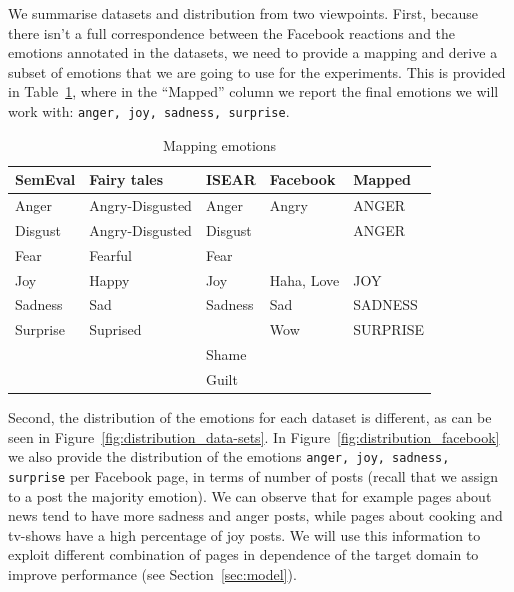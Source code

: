 \documentclass[11pt]{article}
\begin{document}
We summarise datasets and distribution from two viewpoints. First, because there isn't a full correspondence between the Facebook reactions and the emotions annotated in the datasets, we need to provide a mapping and derive a subset of emotions that we are going to use for the experiments. This is provided in Table~\ref{overview_data-sets}, where in the ``Mapped'' column we report the final emotions we will work with: \texttt{anger, joy, sadness, surprise}. 
\begin{table}
\begin{small}
\caption{Mapping emotions\label{overview_data-sets}}
\centering
\begin{tabular}{|l|l|l|l|l|}
\hline
\textbf{SemEval} & \textbf{Fairy tales} & \textbf{ISEAR} & \textbf{Facebook} & \textbf{Mapped} \\ \hline
Anger            & Angry-Disgusted      & Anger               & Angry   & ANGER          \\ \hline
Disgust          & Angry-Disgusted      & Disgust               &    &  ANGER              \\ \hline
Fear             & Fearful              & Fear               &      &              \\ \hline
Joy              & Happy                & Joy                & Haha, Love & JOY\\ \hline
Sadness          & Sad                  & Sadness               & Sad     & SADNESS          \\ \hline
Surprise         & Suprised             &                & Wow          & SURPRISE     \\ 
\hline
                 &                      & Shame               &       &         \\ \hline
                 &                      & Guilt               &       &         \\                  
\hline
\end{tabular}
\end{small}
\end{table}
Second, the distribution of the emotions for each dataset is different, as can be seen in Figure~\ref{fig:distribution_data-sets}. 
In Figure~\ref{fig:distribution_facebook} we also provide the distribution of the emotions \texttt{anger, joy, sadness, surprise} per Facebook page, in terms of number of posts (recall that we assign to a post the majority emotion). We can observe that for example pages about news  tend to have more sadness and anger posts, while pages about cooking and tv-shows have a high percentage of joy posts. We will use this information to exploit different combination of pages in dependence of the target domain to improve performance (see Section~\ref{sec:model}).
\end{document}
